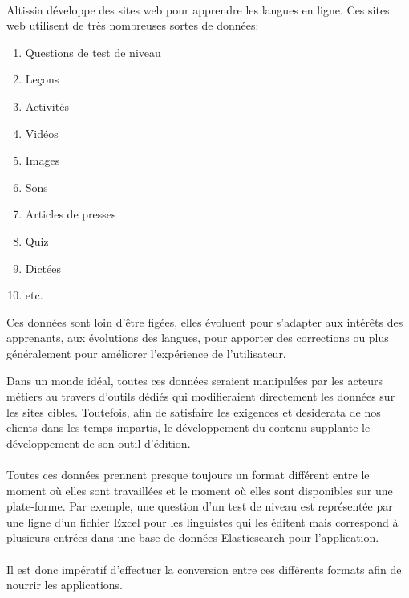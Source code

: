 \paragraph{}
Altissia développe des sites web pour apprendre les langues en ligne.
Ces sites web utilisent de très nombreuses sortes de données:
\begin{enumerate}
    \item Questions de test de niveau
    \item Leçons
    \item Activités
    \item Vidéos
    \item Images
    \item Sons
    \item Articles de presses
    \item Quiz
    \item Dictées
    \item etc.
\end{enumerate}
Ces données sont loin d'être figées, elles évoluent pour s'adapter aux intérêts des apprenants, aux évolutions des langues, pour apporter des corrections ou plus généralement pour améliorer l'expérience de l'utilisateur.

Dans un monde idéal, toutes ces données seraient manipulées par les acteurs métiers au travers d'outils dédiés qui modifieraient directement les données sur les sites cibles. Toutefois, afin de satisfaire les exigences et desiderata de nos clients dans les temps impartis, le développement du contenu supplante le développement de son outil d'édition.

\paragraph{}
Toutes ces données prennent presque toujours un format différent entre le moment où elles sont travaillées et le moment où elles sont disponibles sur une plate-forme.
Par exemple, une question d'un test de niveau est représentée par une ligne d'un fichier Excel pour les linguistes qui les éditent mais correspond à plusieurs entrées dans une base de données Elasticsearch pour l'application.

\paragraph{}
Il est donc impératif d'effectuer la conversion entre ces différents formats afin de nourrir les applications.
